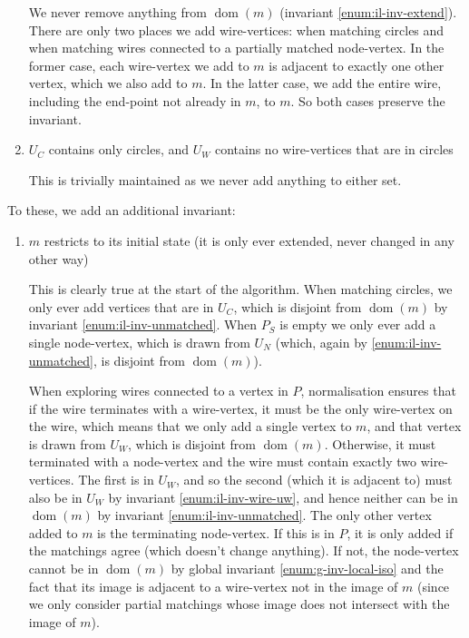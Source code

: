 \documentclass{article}
\DeclareMathOperator{\dom}{dom}
\begin{document}
\begin{enumerate}[label=(\roman*),ref=(\roman*)]
  We never remove anything from $\dom(m)$ (invariant \ref{enum:il-inv-extend}).  There are only two places we add wire-vertices: when matching circles and when matching wires connected to a partially matched node-vertex.  In the former case, each wire-vertex we add to $m$ is adjacent to exactly one other vertex, which we also add to $m$.  In the latter case, we add the entire wire, including the end-point not already in $m$, to $m$.  So both cases preserve the invariant.
  \item $U_C$ contains only circles, and $U_W$ contains no wire-vertices that are in circles

  This is trivially maintained as we never add anything to either set.
\end{enumerate}

To these, we add an additional invariant:
\begin{enumerate}[resume,label=(\roman*),ref=(\roman*)]
  \item \label{enum:il-inv-extend} $m$ restricts to its initial state (it is only ever extended, never changed in any other way)

  This is clearly true at the start of the algorithm.  When matching circles, we only ever add vertices that are in $U_C$, which is disjoint from $\dom(m)$ by invariant \ref{enum:il-inv-unmatched}.  When $P_S$ is empty we only ever add a single node-vertex, which is drawn from $U_N$ (which, again by \ref{enum:il-inv-unmatched}, is disjoint from $\dom(m)$).

  When exploring wires connected to a vertex in $P$, normalisation ensures that if the wire terminates with a wire-vertex, it must be the only wire-vertex on the wire, which means that we only add a single vertex to $m$, and that vertex is drawn from $U_W$, which is disjoint from $\dom(m)$.  Otherwise, it must terminated with a node-vertex and the wire must contain exactly two wire-vertices.  The first is in $U_W$, and so the second (which it is adjacent to) must also be in $U_W$ by invariant \ref{enum:il-inv-wire-uw}, and hence neither can be in $\dom(m)$ by invariant \ref{enum:il-inv-unmatched}.  The only other vertex added to $m$ is the terminating node-vertex.  If this is in $P$, it is only added if the matchings agree (which doesn't change anything).  If not, the node-vertex cannot be in $\dom(m)$ by global invariant \ref{enum:g-inv-local-iso} and the fact that its image is adjacent to a wire-vertex not in the image of $m$ (since we only consider partial matchings whose image does not intersect with the image of $m$).
\end{enumerate}
\end{document}
